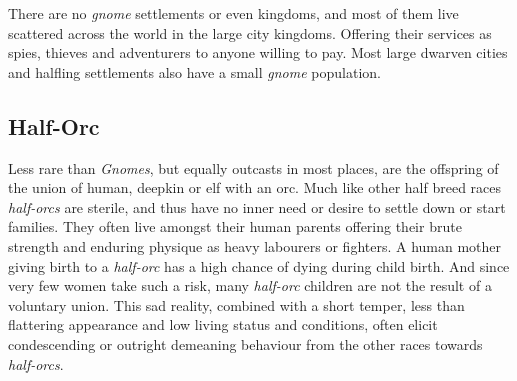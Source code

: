 There are no \emph{gnome} settlements or even kingdoms, and most of them live
scattered across the world in the large city kingdoms. Offering their services
as spies, thieves and adventurers to anyone willing to pay. Most large dwarven
cities and halfling settlements also have a small \emph{gnome} population.

\subsection*{Half-Orc}

Less rare than \emph{Gnomes}, but equally outcasts in most places, are the
offspring of the union of human, deepkin or elf with an orc. Much like other
half breed races \emph{half-orcs} are sterile, and thus have no inner need or
desire to settle down or start families. They often live amongst their human
parents offering their brute strength and enduring physique as heavy labourers
or fighters. A human mother giving birth to a \emph{half-orc} has a high
chance of dying during child birth. And since very few women take such a risk,
many \emph{half-orc} children are not the result of a voluntary union. This
sad reality, combined with a short temper, less than flattering appearance and
low living status and conditions, often elicit condescending or outright
demeaning behaviour from the other races towards \emph{half-orcs}.

